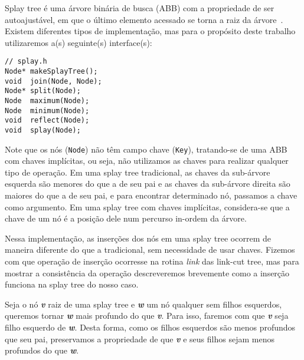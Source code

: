 Splay tree é uma árvore binária de busca (ABB) com a propriedade de ser autoajustável, em que o último elemento acessado se torna a raiz da árvore~\cite{SleatorT1985}. Existem diferentes tipos de implementação, mas para o propósito deste trabalho utilizaremos a(s) seguinte(s) interface(s):  



\begin{verbatim}
// splay.h
Node* makeSplayTree();
void  join(Node, Node); 
Node* split(Node);
Node  maximum(Node);
Node  minimum(Node);
void  reflect(Node);
void  splay(Node);
\end{verbatim}

Note que os nós (\texttt{Node}) não têm campo chave (\texttt{Key}), tratando-se de uma ABB com chaves implícitas, ou seja, não utilizamos as chaves para realizar qualquer tipo de operação. Em uma splay tree tradicional, as chaves da sub-árvore esquerda são menores do que a de seu pai e as chaves da sub-árvore direita são maiores do que a de seu pai, e para encontrar determinado nó, passamos a chave como argumento. 
Em uma splay tree com chaves implícitas, considera-se que a chave de um nó é a posição dele num percurso in-ordem da árvore. 

\newpage


Nessa implementação, as inserções dos nós em uma splay tree ocorrem de maneira diferente do que a tradicional, sem necessidade de usar chaves. Fizemos com que operação de inserção ocorresse na rotina \textit{link} das link-cut tree, mas para mostrar a consistência da operação descreveremos brevemente como a inserção funciona na splay tree do nosso caso.  

Seja o nó \textbf{\textit{v}} raiz de uma splay tree e \textbf{\textit{w}} um nó qualquer sem filhos esquerdos, queremos tornar \textbf{\textit{w}} mais profundo do que \textbf{\textit{v}}. Para isso, faremos com que \textbf{\textit{v}} seja filho esquerdo de \textbf{\textit{w}}. Desta forma, como os filhos esquerdos são menos profundos que seu pai, preservamos a propriedade de que \textbf{\textit{v}} e seus filhos sejam menos profundos do que \textbf{\textit{w}}.  

